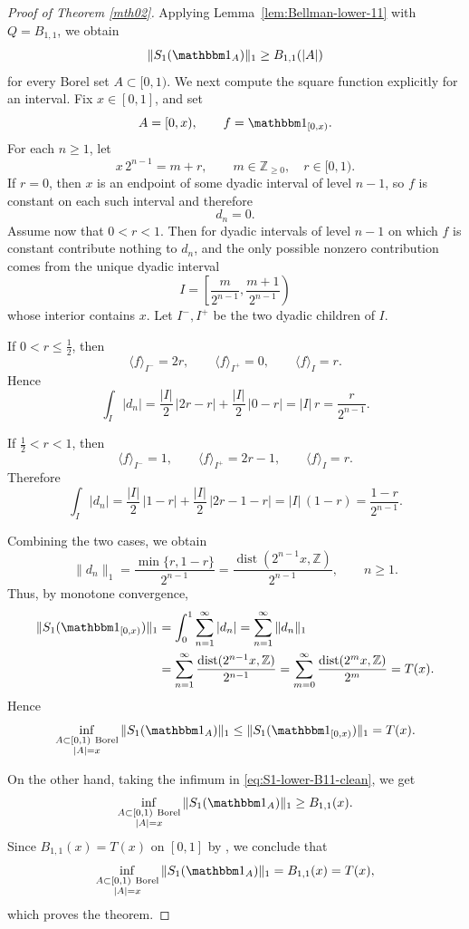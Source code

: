 \documentclass[11pt]{amsart}
\theoremstyle{definition}
\renewcommand{\1}{{\mathbbm{1}}}
\begin{document}
\begin{proof}[Proof of Theorem \ref{mth02}]
Applying Lemma~\ref{lem:Bellman-lower-11} with $Q=B_{1,1}$, we obtain
\begin{equation}\label{eq:S1-lower-B11-clean}
\|S_1(\mathbbm 1_A)\|_1 \ge B_{1,1}(|A|)
\end{equation}
for every Borel set $A\subset{[0,1)}$.
We next compute the square function explicitly for an interval. Fix
$x\in[0,1]$, and set
\[
A=[0,x),\qquad f=\mathbbm 1_{[0,x)}.
\]
For each $n\ge 1$, let
\[
x\,2^{n-1}=m+r,
\qquad m\in\mathbb Z_{\ge 0},\quad r\in[0,1).
\]
If $r=0$, then $x$ is an endpoint of some dyadic interval of level $n-1$,
so $f$ is constant on each such interval and therefore
\[
d_n=0.
\]
Assume now that $0<r<1$. Then for  dyadic intervals of level $n-1$ on which
$f$ is constant contribute nothing to $d_n$, and the only possible nonzero
contribution comes from the unique dyadic interval
\[
I=\left[\frac{m}{2^{n-1}},\frac{m+1}{2^{n-1}}\right)
\]
whose interior contains $x$.
Let $I^-,I^+$ be the two dyadic children of $I$.

If $0<r\le \frac12$, then
\[
\langle f\rangle_{I^-}=2r,\qquad \langle f\rangle_{I^+}=0,
\qquad \langle f\rangle_I=r.
\]
Hence
\[
\int_I |d_n|
=
\frac{|I|}{2}\,|2r-r|
+
\frac{|I|}{2}\,|0-r|
=
|I|\,r
=
\frac{r}{2^{n-1}}.
\]

If $\frac12<r<1$, then
\[
\langle f\rangle_{I^-}=1,\qquad \langle f\rangle_{I^+}=2r-1,
\qquad \langle f\rangle_I=r.
\]
Therefore
\[
\int_I |d_n|
=
\frac{|I|}{2}\,|1-r|
+
\frac{|I|}{2}\,|2r-1-r|
=
|I|\,(1-r)
=
\frac{1-r}{2^{n-1}}.
\]

Combining the two cases, we obtain
\[
\|d_n\|_1
=
\frac{\min\{r,1-r\}}{2^{n-1}}
=
\frac{\operatorname{dist}(2^{n-1}x,\mathbb Z)}{2^{n-1}},
\qquad n\ge 1.
\]
Thus, by monotone convergence,
\begin{align*}
\|S_1(\mathbbm 1_{[0,x)})\|_1
&=
\int_0^1 \sum_{n=1}^\infty |d_n|
=
\sum_{n=1}^\infty \|d_n\|_1 \\
&=
\sum_{n=1}^\infty
\frac{\operatorname{dist}(2^{n-1}x,\mathbb Z)}{2^{n-1}}
=
\sum_{m=0}^\infty \frac{\operatorname{dist}(2^m x,\mathbb Z)}{2^m}
=
T(x).
\end{align*}
Hence
\[
\inf_{\substack{A\subset{[0,1)}\ \mathrm{Borel}\\ |A|=x}}
\|S_1(\mathbbm 1_A)\|_1
\le
\|S_1(\mathbbm 1_{[0,x)})\|_1
=
T(x).
\]

On the other hand, taking the infimum in \eqref{eq:S1-lower-B11-clean}, we get
\[
\inf_{\substack{A\subset{[0,1)}\ \mathrm{Borel}\\ |A|=x}}
\|S_1(\mathbbm 1_A)\|_1
\ge
B_{1,1}(x).
\]
Since $B_{1,1}(x)=T(x)$ on $[0,1]$ by \cite[Theorem 7]{Lev}, we conclude that
\[
\inf_{\substack{A\subset{[0,1)}\ \mathrm{Borel}\\ |A|=x}}
\|S_1(\mathbbm 1_A)\|_1
=
B_{1,1}(x)
=
T(x),
\]
which proves the theorem.
\end{proof}
\end{document}
